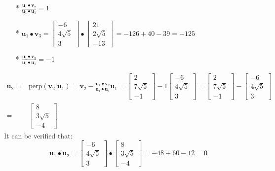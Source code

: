 \documentclass{article}
\begin{document}
\begin{description}
\begin{itemize}
\item[*] \(\frac{\mathbf{u}_1 \bullet \mathbf{v}_2}{\mathbf{u}_1 \bullet \mathbf{u}_1} = 1\)
\item[*] \(\mathbf{u}_1 \bullet \mathbf{v}_3 = \begin{bmatrix} -6 \\ 4\sqrt{5} \\ 3 \end{bmatrix} \bullet \begin{bmatrix} 21 \\ 2\sqrt{5} \\ -13 \end{bmatrix} = -126 + 40 - 39 = -125\)
\item[*] \(\frac{\mathbf{u}_1 \bullet \mathbf{v}_3}{\mathbf{u}_1 \bullet \mathbf{u}_1} = -1\)
\end{itemize}
\begin{align*}
\mathbf{u}_2 = & \text{perp}(\mathbf{v}_2 | \mathbf{u}_1) = \mathbf{v}_2 - \frac{\mathbf{u}_1 \bullet \mathbf{v}_2}{\mathbf{u}_1 \bullet \mathbf{u}_1}\mathbf{u}_1 
= \begin{bmatrix} 2 \\ 7\sqrt{5} \\ -1 \end{bmatrix} - 1\begin{bmatrix} -6 \\ 4 \sqrt{5} \\ 3 \end{bmatrix} 
= \begin{bmatrix} 2 \\ 7\sqrt{5} \\ -1 \end{bmatrix} - \begin{bmatrix} -6 \\ 4 \sqrt{5} \\ 3 \end{bmatrix} \\
= & \begin{bmatrix} 8 \\ 3\sqrt{5} \\ -4 \end{bmatrix} 
\end{align*}
It can be verified that:
\[\mathbf{u}_1 \bullet \mathbf{u}_2 = \begin{bmatrix} -6 \\ 4\sqrt{5} \\ 3 \end{bmatrix} \bullet \begin{bmatrix} 8 \\ 3\sqrt{5} \\ -4 \end{bmatrix} = -48 + 60 - 12 = 0\]

\end{description}
\end{document}
